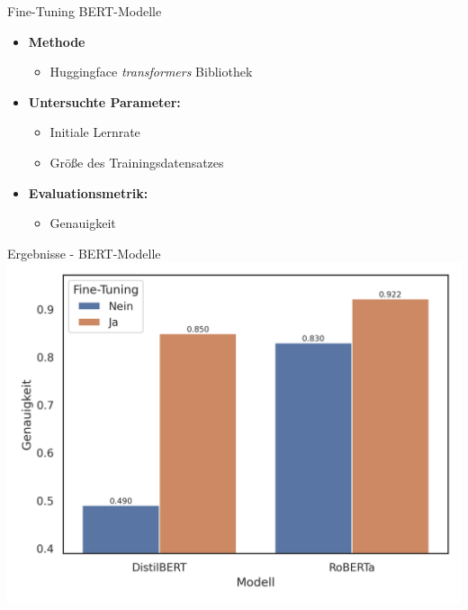 \documentclass[aspectratio=169]{beamer} %
\begin{document}
\begin{frame}{Fine-Tuning BERT-Modelle}
\begin{itemize}
        \item \textbf{Methode}
            \begin{itemize}
                \item Huggingface \textit{transformers} Bibliothek
            \end{itemize}
        \item \textbf{Untersuchte Parameter:}
        \begin{itemize}
            \item Initiale Lernrate
            \item Größe des Trainingsdatensatzes
        \end{itemize}
        \item \textbf{Evaluationsmetrik:}
        \begin{itemize}
            \item Genauigkeit
        \end{itemize}
\end{itemize}
\end{frame}


\begin{frame}{Ergebnisse - BERT-Modelle}
    \centering
     \includegraphics[scale=0.65]{../datasets/sentiment140/results/plots/bert-based-genauigkeit-bert-basierte-modelle-default-vs.-fine-tuned-truncated-y-axis.png}
\end{frame}
\end{document}
